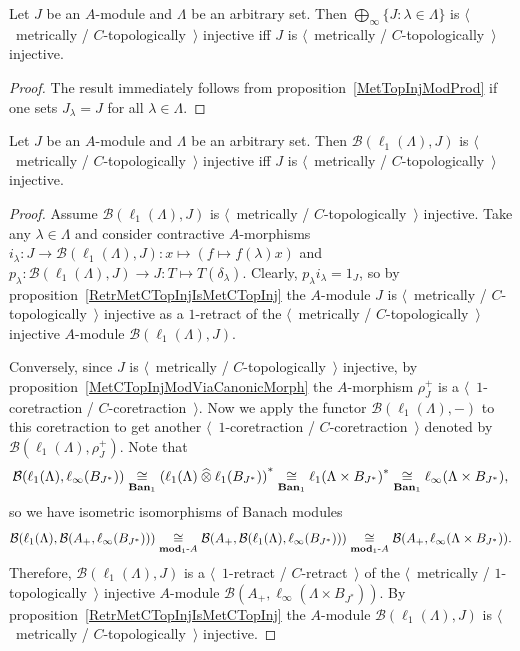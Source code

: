 \begin{corollary}\label{MetTopInjlInftySum} Let $J$ be an $A$-module and
$\Lambda$ be an arbitrary set. Then $\bigoplus_\infty \{J:\lambda\in\Lambda \}$
is $\langle$~metrically / $C$-topologically~$\rangle$ injective iff $J$ is
$\langle$~metrically / $C$-topologically~$\rangle$ injective.
\end{corollary}
\begin{proof} The result immediately follows from
proposition~\ref{MetTopInjModProd} if one sets $J_\lambda=J$ 
for all $\lambda\in\Lambda$.
\end{proof}

\begin{proposition}\label{MapsFroml1toMetTopInj} Let $J$ be an $A$-module and
$\Lambda$ be an arbitrary set. Then $\mathcal{B}(\ell_1(\Lambda),J)$ is
$\langle$~metrically / $C$-topologically~$\rangle$ injective iff $J$ is
$\langle$~metrically / $C$-topologically~$\rangle$ injective.
\end{proposition}
\begin{proof} 
Assume $\mathcal{B}(\ell_1(\Lambda), J)$ is $\langle$~metrically /
$C$-topologically~$\rangle$ injective. Take any $\lambda\in\Lambda$ and consider
contractive $A$-morphisms
$i_\lambda:J\to\mathcal{B}(\ell_1(\Lambda),J):x\mapsto(f\mapsto f(\lambda)x)$
and $p_\lambda:\mathcal{B}(\ell_1(\Lambda),J)\to J:T\mapsto T(\delta_\lambda)$.
Clearly, $p_\lambda i_\lambda=1_J$, so by 
proposition~\ref{RetrMetCTopInjIsMetCTopInj} the $A$-module $J$ 
is $\langle$~metrically / $C$-topologically~$\rangle$ injective as a $1$-retract 
of the $\langle$~metrically / $C$-topologically~$\rangle$ injective 
$A$-module $\mathcal{B}(\ell_1(\Lambda),J)$.

Conversely, since $J$ is $\langle$~metrically / $C$-topologically~$\rangle$
injective, by proposition~\ref{MetCTopInjModViaCanonicMorph} 
the $A$-morphism $\rho_J^+$ is 
a $\langle$~$1$-coretraction / $C$-coretraction~$\rangle$. 
Now we apply the functor $\mathcal{B}(\ell_1(\Lambda),-)$ to this 
coretraction to get another 
$\langle$~$1$-coretraction / $C$-coretraction~$\rangle$ denoted by
$\mathcal{B}(\ell_1(\Lambda),\rho_J^+)$. Note that 
\[
\mathcal{B}(\ell_1(\Lambda),\ell_\infty(B_{J^*}))
\mathrel{\mathop{\cong}\limits_{\mathbf{Ban}_1}}
{(\ell_1(\Lambda)\mathbin{\widehat{\otimes}} \ell_1(B_{J^*}))}^*
\mathrel{\mathop{\cong}\limits_{\mathbf{Ban}_1}}
{\ell_1(\Lambda\times B_{J^*})}^*
\mathrel{\mathop{\cong}\limits_{\mathbf{Ban}_1}}
\ell_\infty(\Lambda\times B_{J^*}),
\] 
so we have isometric isomorphisms of Banach modules
\[
\mathcal{B}(\ell_1(\Lambda),\mathcal{B}(A_+,\ell_\infty(B_{J^*})))
\mathrel{\mathop{\cong}\limits_{\mathbf{mod}_1\text{-}A}}
\mathcal{B}(A_+,\mathcal{B}(\ell_1(\Lambda),\ell_\infty(B_{J^*})))
\mathrel{\mathop{\cong}\limits_{\mathbf{mod}_1\text{-}A}}
\mathcal{B}(A_+,\ell_\infty(\Lambda\times B_{J^*})).
\] 
Therefore, $\mathcal{B}(\ell_1(\Lambda),J)$ is a $\langle$~$1$-retract /
$C$-retract~$\rangle$ of the $\langle$~metrically / $1$-topologically~$\rangle$
injective $A$-module $\mathcal{B}(A_+,\ell_\infty(\Lambda\times B_{J^*}))$. By
proposition~\ref{RetrMetCTopInjIsMetCTopInj} the $A$-module
$\mathcal{B}(\ell_1(\Lambda), J)$ is $\langle$~metrically /
$C$-topologically~$\rangle$ injective.
\end{proof}

